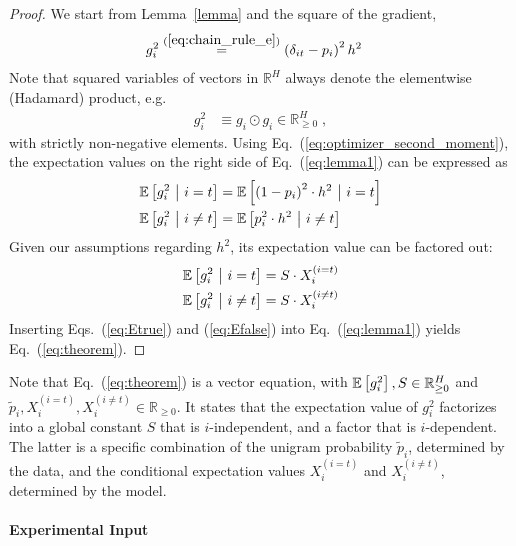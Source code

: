 \begin{proof}
We start from Lemma~\ref{lemma} and the square of the gradient,
\begin{align}
g_i^2 
&\stackrel{(\ref{eq:chain_rule_e})}{=} \left( \delta_{it} - p_i \right)^2 h^2 
\label{eq:optimizer_second_moment}
\end{align}
Note that squared variables of vectors in $\mathbb{R}^H$ always denote the elementwise (Hadamard) product, e.g.
\begin{align}
g_i^2 &\equiv g_i \odot g_i \in \mathbb{R}_{\geq 0}^H \; ,
\label{eq:hadamard_product}
\end{align}
with strictly non-negative elements.
Using Eq.~(\ref{eq:optimizer_second_moment}), the expectation values on the right side of Eq.~(\ref{eq:lemma1}) can be expressed as
\begin{align}
\mathbb{E} \left[ g_i^2 ~\big|~ i=t \right]
&= \mathbb{E} \left[ \left( 1 - p_i \right)^2 \cdot h^2 ~\big|~ i=t \right] \\
\mathbb{E} \left[ g_i^2 ~\big|~ i\neq t \right]
&= \mathbb{E} \left[ p_i^2 \cdot h^2 ~\big|~ i\neq t \right]
\end{align}
Given our assumptions regarding $h^2$, its expectation value can be factored out:
\begin{align}
\mathbb{E} \left[ g_i^2 ~\big|~ i=t \right]
&= S \cdot X_i^{(i=t)} \label{eq:Etrue} \\
\mathbb{E} \left[ g_i^2 ~\big|~ i\neq t \right]
&= S \cdot X_i^{(i \neq t)} \label{eq:Efalse} 
\end{align}
Inserting Eqs.~(\ref{eq:Etrue}) and (\ref{eq:Efalse}) into Eq.~(\ref{eq:lemma1}) yields Eq.~(\ref{eq:theorem}).
\end{proof}

Note that Eq.~(\ref{eq:theorem}) is a vector equation, with $\mathbb{E} \left[ g_i^2 \right], S \in \mathbb{R}_{\geq 0}^H$ and $\widetilde p_i, X_i^{(i=t)}, X_i^{(i \neq t)} \in \mathbb{R}_{\geq 0}$.
It states that the expectation value of $g_i^2$ factorizes into a global constant $S$ that is $i$-independent, and a factor that is $i$-dependent. The latter is a specific combination of the unigram probability $\widetilde p_i$, determined by the data, and the conditional expectation values $X_i^{(i=t)}$ and $X_i^{(i\neq t)}$, determined by the model.

\paragraph{Experimental Input}

